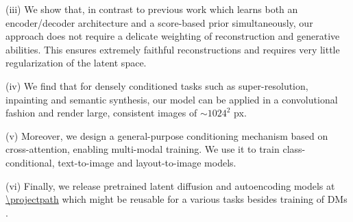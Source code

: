\documentclass[10pt,twocolumn,letterpaper]{article}
\begin{document}
(iii) We show that, in contrast to previous work \cite{DBLP:journals/corr/abs-2106-05931} which learns both an encoder/decoder architecture and a score-based prior simultaneously, our
approach does not require a delicate weighting of reconstruction and generative abilities. 
This ensures extremely faithful reconstructions and requires very little regularization of the latent space.

(iv) We find that for densely conditioned tasks such as super-resolution, inpainting and semantic synthesis, our model can be applied in a 
convolutional fashion and render large, consistent images of $\sim 1024^2$ px.

(v) Moreover, %
we design a general-purpose conditioning mechanism based on cross-attention, enabling multi-modal training. 
We use it to train class-conditional, text-to-image and layout-to-image models.

(vi) Finally, we release pretrained latent diffusion and autoencoding models at \url{\projectpath} 
which might be reusable for a various tasks besides 
training of DMs \cite{clipguiding}. 
%
%
%
%

%
%
%
%
%
%

%
\end{document}

